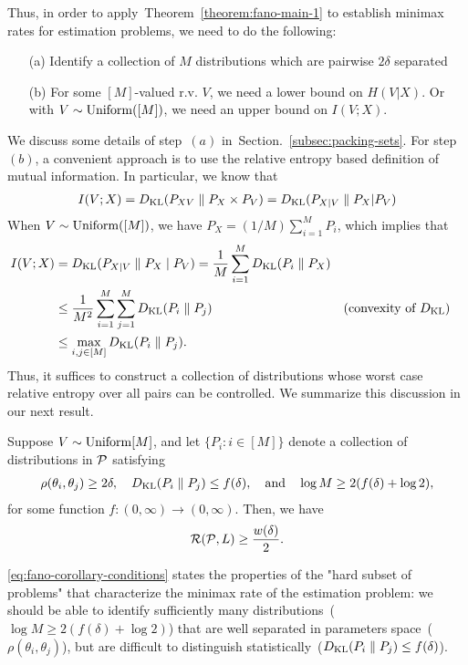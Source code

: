 \documentclass[12pt]{article}
\begin{document}
Thus, in order to apply~Theorem~\ref{theorem:fano-main-1} to establish minimax rates for estimation problems, we need to do the following: 
\begin{itemize}
	\item[(a)] Identify a collection of $M$ distributions which are pairwise $2\delta$ separated
	\item[(b)] For some $[M]$-valued r.v. $V$, we need a lower bound on $H(V|X)$. Or with $V \sim \mathrm{Uniform}([M])$, we need an upper bound on $I(V; X)$. 
\end{itemize}
We discuss some details of step~$(a)$ in~Section.~\ref{subsec:packing-sets}. For step $(b)$, a convenient approach is to use the relative entropy based definition of mutual information. In particular, we know that 
\begin{align}
	I(V; X) = D_{\text{KL}}(P_{XV} \parallel P_X \times P_V) = D_{\text{KL}}(P_{X|V} \parallel P_X | P_V)
\end{align}
When $V \sim \mathrm{Uniform}([M])$, we have $P_X = (1/M) \sum_{i=1}^M P_i$, which implies that 
\begin{align}
	I(V; X) &= D_{\text{KL}}(P_{X|V} \parallel P_X \mid P_V) = \frac{1}{M} \sum_{i=1}^M D_{\text{KL}}(P_i \parallel P_X) \\
	& \leq \frac{1}{M^2} \sum_{i=1}^M \sum_{j=1}^M D_{\text{KL}}(P_i \parallel P_j) && (\text{convexity of } D_{\text{KL}}) \\
	& \leq \max_{i, j \in [M]} D_{\text{KL}}(P_i \parallel P_j). 
\end{align}
Thus, it suffices to construct a collection of distributions whose worst case relative entropy over all pairs can be controlled. We summarize this discussion in our next result. 

\begin{corollary}
	\label{corollary:fano-kl-version} Suppose $V \sim \mathrm{Uniform}{[M]}$, and let $\{P_i: i \in [M]\}$ denote a collection of distributions in ${\cal P}$ satisfying 
	\begin{align}
		\rho(\theta_i, \theta_j) \geq 2\delta, \quad D_{\text{KL}}(P_i \parallel P_j) \leq f(\delta), \quad \text{and} \quad \log M \geq 2(f(\delta) + \log 2),  \label{eq:fano-corollary-conditions}
	\end{align} 
	for some function $f:(0, \infty) \to (0, \infty)$. Then, we have 
	\begin{align}
		{\cal R}({\cal P}, L) \geq \frac{w(\delta)}{2}. 
	\end{align}
\end{corollary}

\begin{remark}
	\label{remark:fano-corollary}
	\eqref{eq:fano-corollary-conditions} states the properties of the "hard subset of problems" that characterize the minimax rate of the estimation problem: we should be able to identify sufficiently many distributions~($\log M \geq 2(f(\delta) + \log 2)$) that are well separated in parameters space~($\rho(\theta_i, \theta_j)$), but are difficult to distinguish statistically~($D_{\text{KL}}(P_i\parallel P_j) \leq f(\delta)$). 
\end{remark}
\end{document}
